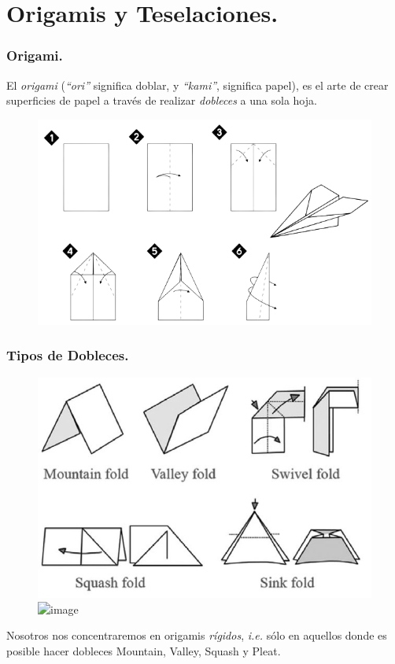 \documentclass{beamer}
\begin{document}
\section{Origamis y Teselaciones.} %
\frame{\sectionpage}
\begin{frame}[t]
	\frametitle{Origami.}
	\begin{exampleblock}{}
		El \textit{\color{blue}origami} (\textit{``ori''} significa doblar, y \textit{``kami''}, significa papel), es el arte de crear superficies de papel a través de realizar \textit{dobleces} a una sola hoja. \\[2mm]
		\begin{figure}[hbtp!]
			\centering
			\includegraphics[width= 0.9 \linewidth]{IMAGENES/1_DEF/ex_1.png}
		\end{figure}
	\end{exampleblock}
\end{frame}

\begin{frame}[t]
	\frametitle{Tipos de Dobleces.}
	\begin{figure}[hbtp!]\begin{overprint}
		\includegraphics[width= 0.45 \linewidth, page = 1]{IMAGENES/1_DEF/tipos_1}
		\includegraphics<2>[width= 0.45 \linewidth, page = 1]{IMAGENES/1_DEF/tipos_2}
	\end{overprint}
\end{figure}
	Nosotros nos concentraremos en origamis \textit{rígidos}, \textit{i.e.} sólo en aquellos donde es posible hacer dobleces \color{red} Mountain, \color{blue} Valley, \color{black} Squash y Pleat.
\end{frame}
\end{document}
